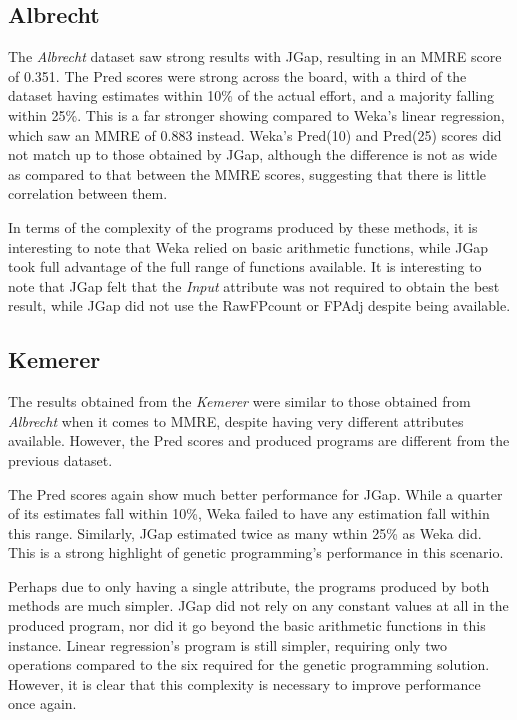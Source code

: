 \documentclass[11pt, a4paper]{article}
\begin{document}
\subsection{Albrecht} %
\label{sub:albrecht_comp}
The \emph{Albrecht} dataset saw strong results with JGap, resulting in an MMRE
score of 0.351. The Pred scores were strong across the board, with a third of
the dataset having estimates within 10\% of the actual effort, and a majority
falling within 25\%. This is a far stronger showing compared to Weka's linear
regression, which saw an MMRE of 0.883 instead. Weka's Pred(10) and Pred(25)
scores did not match up to those obtained by JGap, although the difference is
not as wide as compared to that between the MMRE scores, suggesting that there
is little correlation between them.

In terms of the complexity of the programs produced by these methods, it is
interesting to note that Weka relied on basic arithmetic functions, while
JGap took full advantage of the full range of functions available. It is
interesting to note that JGap felt that the \emph{Input} attribute was not
required to obtain the best result, while JGap did not use the RawFPcount or
FPAdj despite being available.

\subsection{Kemerer} %
\label{sub:kemerer_comp}
The results obtained from the \emph{Kemerer} were similar to those obtained from
\emph{Albrecht} when it comes to MMRE, despite having very different attributes
available. However, the Pred scores and produced programs are different from the
previous dataset.

The Pred scores again show much better performance for JGap. While a quarter of
its estimates fall within 10\%, Weka failed to have any estimation fall within
this range. Similarly, JGap estimated twice as many wthin 25\% as Weka did. This
is a strong highlight of genetic programming's performance in this scenario.

Perhaps due to only having a single attribute, the programs produced by both
methods are much simpler. JGap did not rely on any constant values at all in
the produced program, nor did it go beyond the basic arithmetic functions in
this instance. Linear regression's program is still simpler, requiring only two
operations compared to the six required for the genetic programming solution.
However, it is clear that this complexity is necessary to improve performance
once again.
\end{document}
